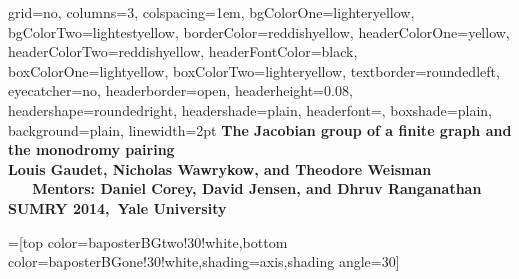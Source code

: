 \documentclass[landscape,final,columns=3]{baposter}
\begin{document}
\begin{poster}{
  grid=no,
  columns=3,
   colspacing=1em,
  bgColorOne=lighteryellow, %
  bgColorTwo=lightestyellow, %
  borderColor=reddishyellow,
  headerColorOne=yellow,
  headerColorTwo=reddishyellow,
  headerFontColor=black,
  boxColorOne=lightyellow,
  boxColorTwo=lighteryellow,
  textborder=roundedleft,
  eyecatcher=no,
  headerborder=open,
  headerheight=0.08\textheight,
  headershape=roundedright,
  headershade=plain,
  headerfont=\Large\textsf, %
  boxshade=plain,
  background=plain,
  linewidth=2pt
  }
  {
  }
{\bf{\textcolor{mit}{The Jacobian group of a finite graph and the monodromy pairing}} %
{\rm \\ \large  Louis Gaudet, Nicholas Wawrykow, and Theodore Weisman \ \ \
 \textbf{Mentors:} Daniel Corey, David Jensen, and Dhruv Ranganathan \\
 SUMRY 2014,\ Yale University
  }}


  =[top color=baposterBGtwo!30!white,bottom color=baposterBGone!30!white,shading=axis,shading angle=30]
     \newlength{\leftimgwidth}
     \setlength{\leftimgwidth}{0.78em+8.0em}


\end{poster}
\end{document}
